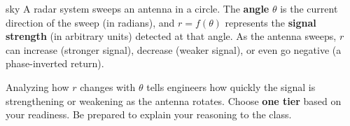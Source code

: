 \documentclass[10pt]{article}
\begin{document}
\namepartnerperiod

\vspace{0.10in}

\begin{scenariobox}{sky}
A radar system sweeps an antenna in a circle. The \textbf{angle} $\theta$ is the
current direction of the sweep (in radians), and $r = f(\theta)$ represents the
\textbf{signal strength} (in arbitrary units) detected at that angle. As the antenna
sweeps, $r$ can increase (stronger signal), decrease (weaker signal), or even
go negative (a phase-inverted return).

Analyzing how $r$ changes with $\theta$ tells engineers how quickly the signal
is strengthening or weakening as the antenna rotates. Choose \textbf{one tier}
based on your readiness. Be prepared to explain your reasoning to the class.
\end{scenariobox}

\vspace{0.08in}
\end{document}
